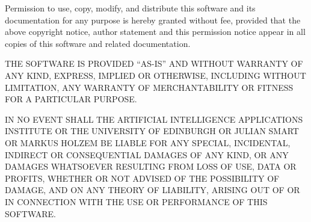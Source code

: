 Permission to use, copy, modify, and distribute this software and its
documentation for any purpose is hereby granted without fee, provided that the
above copyright notice, author statement and this permission notice appear in
all copies of this software and related documentation.

THE SOFTWARE IS PROVIDED ``AS-IS'' AND WITHOUT WARRANTY OF ANY KIND, EXPRESS,
IMPLIED OR OTHERWISE, INCLUDING WITHOUT LIMITATION, ANY WARRANTY OF
MERCHANTABILITY OR FITNESS FOR A PARTICULAR PURPOSE.

IN NO EVENT SHALL THE ARTIFICIAL INTELLIGENCE APPLICATIONS INSTITUTE OR THE
UNIVERSITY OF EDINBURGH OR JULIAN SMART OR MARKUS HOLZEM BE LIABLE FOR ANY SPECIAL, INCIDENTAL, INDIRECT OR
CONSEQUENTIAL DAMAGES OF ANY KIND, OR ANY DAMAGES WHATSOEVER RESULTING FROM
LOSS OF USE, DATA OR PROFITS, WHETHER OR NOT ADVISED OF THE POSSIBILITY OF
DAMAGE, AND ON ANY THEORY OF LIABILITY, ARISING OUT OF OR IN CONNECTION WITH
THE USE OR PERFORMANCE OF THIS SOFTWARE.



\newpage

\nocite{helpbook}%
\nocite{wong93}%
\nocite{pree94}%
\nocite{gamma95}%
\nocite{smart95a}%
\nocite{smart95b}%


%
\setfooter{\thepage}{}{}{}{}{\thepage}%

\newpage
{}
%
\setfooter{\thepage}{}{}{}{}{\thepage}%
\printindex


